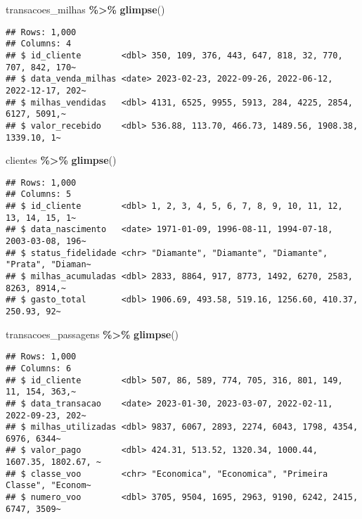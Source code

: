 \documentclass[
]{article}
\newenvironment{Shaded}{\begin{snugshade}}{\end{snugshade}}
\newcommand{\FunctionTok}[1]{\textcolor[rgb]{0.13,0.29,0.53}{\textbf{#1}}}
\newcommand{\NormalTok}[1]{#1}
\newcommand{\SpecialCharTok}[1]{\textcolor[rgb]{0.81,0.36,0.00}{\textbf{#1}}}
\begin{document}
\begin{Shaded}
\begin{Highlighting}[]
\NormalTok{transacoes\_milhas }\SpecialCharTok{\%\textgreater{}\%} \FunctionTok{glimpse}\NormalTok{()}
\end{Highlighting}
\end{Shaded}

\begin{verbatim}
## Rows: 1,000
## Columns: 4
## $ id_cliente        <dbl> 350, 109, 376, 443, 647, 818, 32, 770, 707, 842, 170~
## $ data_venda_milhas <date> 2023-02-23, 2022-09-26, 2022-06-12, 2022-12-17, 202~
## $ milhas_vendidas   <dbl> 4131, 6525, 9955, 5913, 284, 4225, 2854, 6127, 5091,~
## $ valor_recebido    <dbl> 536.88, 113.70, 466.73, 1489.56, 1908.38, 1339.10, 1~
\end{verbatim}

\begin{Shaded}
\begin{Highlighting}[]
\NormalTok{clientes }\SpecialCharTok{\%\textgreater{}\%} \FunctionTok{glimpse}\NormalTok{()}
\end{Highlighting}
\end{Shaded}

\begin{verbatim}
## Rows: 1,000
## Columns: 5
## $ id_cliente        <dbl> 1, 2, 3, 4, 5, 6, 7, 8, 9, 10, 11, 12, 13, 14, 15, 1~
## $ data_nascimento   <date> 1971-01-09, 1996-08-11, 1994-07-18, 2003-03-08, 196~
## $ status_fidelidade <chr> "Diamante", "Diamante", "Diamante", "Prata", "Diaman~
## $ milhas_acumuladas <dbl> 2833, 8864, 917, 8773, 1492, 6270, 2583, 8263, 8914,~
## $ gasto_total       <dbl> 1906.69, 493.58, 519.16, 1256.60, 410.37, 250.93, 92~
\end{verbatim}

\begin{Shaded}
\begin{Highlighting}[]
\NormalTok{transacoes\_passagens }\SpecialCharTok{\%\textgreater{}\%} \FunctionTok{glimpse}\NormalTok{()}
\end{Highlighting}
\end{Shaded}

\begin{verbatim}
## Rows: 1,000
## Columns: 6
## $ id_cliente        <dbl> 507, 86, 589, 774, 705, 316, 801, 149, 11, 154, 363,~
## $ data_transacao    <date> 2023-01-30, 2023-03-07, 2022-02-11, 2022-09-23, 202~
## $ milhas_utilizadas <dbl> 9837, 6067, 2893, 2274, 6043, 1798, 4354, 6976, 6344~
## $ valor_pago        <dbl> 424.31, 513.52, 1320.34, 1000.44, 1607.35, 1802.67, ~
## $ classe_voo        <chr> "Economica", "Economica", "Primeira Classe", "Econom~
## $ numero_voo        <dbl> 3705, 9504, 1695, 2963, 9190, 6242, 2415, 6747, 3509~
\end{verbatim}
\end{document}
